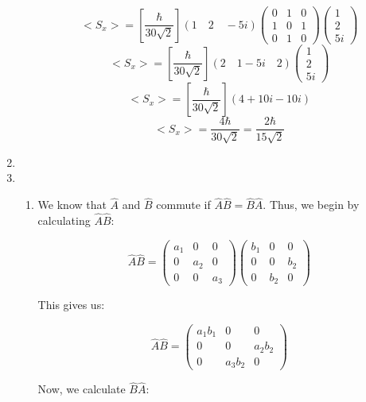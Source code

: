 \begin{enumerate}
\begin{enumerate}
          $$<S_x>=\left[ \frac{\hbar}{30\sqrt{2}} \right](1\quad 2\quad -5i)\left( \begin{matrix} 0 & 1 & 0\\ 1 & 0 & 1\\ 0 & 1 & 0\end{matrix} \right)\left( \begin{matrix}1\\2\\5i\end{matrix} \right)$$
          $$<S_x>=\left[ \frac{\hbar}{30\sqrt{2}} \right](2\quad 1-5i\quad 2)\left( \begin{matrix}1\\2\\5i\end{matrix} \right)$$
          $$<S_x>=\left[ \frac{\hbar}{30\sqrt{2}} \right](4+10i-10i)$$
          $$\boxed{<S_x>= \frac{4\hbar}{30\sqrt{2}}=\frac{2\hbar}{15\sqrt{2}}}$$

    \end{enumerate}

  \item

  \item

    \begin{enumerate}

      \item We know that $\hat{A}$ and $\hat{B}$ commute if $\hat{A}\hat{B}=\hat{B}\hat{A}$. Thus, we begin by calculating $\hat{A}\hat{B}$:

        $$\hat{A}\hat{B}=\left( \begin{matrix} a_1 & 0 & 0\\ 0 & a_2 & 0\\ 0 & 0 & a_3\end{matrix} \right)\left( \begin{matrix} b_1 & 0 & 0\\ 0 & 0 & b_2\\ 0 & b_2 & 0\end{matrix} \right)$$

        This gives us:

        $$\hat{A}\hat{B}=\left( \begin{matrix} a_1b_1 & 0 & 0\\ 0 & 0 & a_2b_2\\ 0 & a_3b_2 & 0\end{matrix} \right)$$

        Now, we calculate $\hat{B}\hat{A}$:


\end{enumerate}
\end{enumerate}
